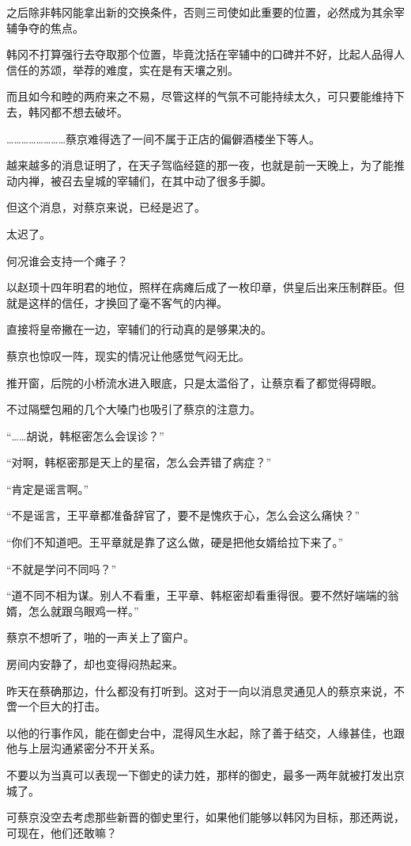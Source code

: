 之后除非韩冈能拿出新的交换条件，否则三司使如此重要的位置，必然成为其余宰辅争夺的焦点。

韩冈不打算强行去夺取那个位置，毕竟沈括在宰辅中的口碑并不好，比起人品得人信任的苏颂，举荐的难度，实在是有天壤之别。

而且如今和睦的两府来之不易，尽管这样的气氛不可能持续太久，可只要能维持下去，韩冈都不想去破坏。

……………………蔡京难得选了一间不属于正店的偏僻酒楼坐下等人。

越来越多的消息证明了，在天子驾临经筵的那一夜，也就是前一天晚上，为了能推动内禅，被召去皇城的宰辅们，在其中动了很多手脚。

但这个消息，对蔡京来说，已经是迟了。

太迟了。

何况谁会支持一个瘫子？

以赵顼十四年明君的地位，照样在病瘫后成了一枚印章，供皇后出来压制群臣。但就是这样的信任，才换回了毫不客气的内禅。

直接将皇帝撇在一边，宰辅们的行动真的是够果决的。

蔡京也惊叹一阵，现实的情况让他感觉气闷无比。

推开窗，后院的小桥流水进入眼底，只是太滥俗了，让蔡京看了都觉得碍眼。

不过隔壁包厢的几个大嗓门也吸引了蔡京的注意力。

“……胡说，韩枢密怎么会误诊？”

“对啊，韩枢密那是天上的星宿，怎么会弄错了病症？”

“肯定是谣言啊。”

“不是谣言，王平章都准备辞官了，要不是愧疚于心，怎么会这么痛快？”

“你们不知道吧。王平章就是靠了这么做，硬是把他女婿给拉下来了。”

“不就是学问不同吗？”

“道不同不相为谋。别人不看重，王平章、韩枢密却看重得很。要不然好端端的翁婿，怎么就跟乌眼鸡一样。”

蔡京不想听了，啪的一声关上了窗户。

房间内安静了，却也变得闷热起来。

昨天在蔡确那边，什么都没有打听到。这对于一向以消息灵通见人的蔡京来说，不啻一个巨大的打击。

以他的行事作风，能在御史台中，混得风生水起，除了善于结交，人缘甚佳，也跟他与上层沟通紧密分不开关系。

不要以为当真可以表现一下御史的读力姓，那样的御史，最多一两年就被打发出京城了。

可蔡京没空去考虑那些新晋的御史里行，如果他们能够以韩冈为目标，那还两说，可现在，他们还敢嘛？

